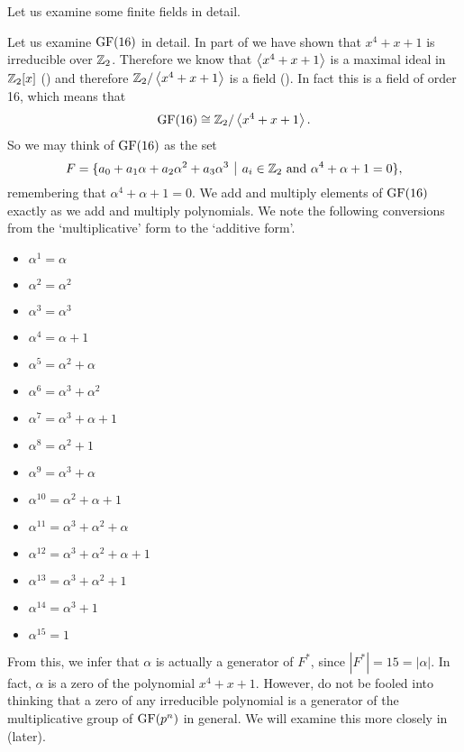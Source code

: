 Let us examine some finite fields in detail.
\begin{example}\label{example-GF16-analysis}
    Let us examine $\mathrm{GF}(16)$ in detail. In part of  we have shown that $x^4 + x + 1$ is irreducible over $\mathbb{Z}_2$. Therefore we know that $\left\langle x^4 + x + 1\right\rangle$ is a maximal ideal in $\mathbb{Z}_2[x]$ () and therefore $\mathbb{Z}_2/\left\langle x^4+x+1\right\rangle$ is a field (). In fact this is a field of order 16, which means that
    \[
        \mathrm{GF}(16) \cong \mathbb{Z}_2/\left\langle x^4+x+1\right\rangle.
    \]
    So we may think of $\mathrm{GF}(16)$ as the set
    \[
        F = \{a_0 + a_1\alpha + a_2\alpha^2 + a_3\alpha^3 \vert a_i \in \Z_2 \text{ and } \alpha^4 + \alpha + 1 = 0\},
    \]
    remembering that $\alpha^4 + \alpha + 1 = 0$. We add and multiply elements of $\mathrm{GF}(16)$ exactly as we add and multiply polynomials. We note the following conversions from the `multiplicative' form to the `additive form'.
    \begin{multicols}{2}
        \begin{itemize}
            \item $\alpha^1 = \alpha$
            \item $\alpha^2 = \alpha^2$
            \item $\alpha^3 = \alpha^3$
            \item $\alpha^4 = \alpha + 1$
            \item $\alpha^5 = \alpha^2 + \alpha$
            \item $\alpha^6 = \alpha^3 + \alpha^2$
            \item $\alpha^7 = \alpha^3 + \alpha + 1$
            \item $\alpha^8 = \alpha^2 + 1$
            \item $\alpha^9 = \alpha^3 + \alpha$
            \item $\alpha^{10} = \alpha^2 + \alpha + 1$
            \item $\alpha^{11} = \alpha^3 + \alpha^2 + \alpha$
            \item $\alpha^{12} = \alpha^3 + \alpha^2 + \alpha + 1$
            \item $\alpha^{13} = \alpha^3 + \alpha^2 + 1$
            \item $\alpha^{14} = \alpha^3 + 1$
            \item $\alpha^{15} = 1$
        \end{itemize}
    \end{multicols}
    From this, we infer that $\alpha$ is actually a generator of $F^\ast$, since $|F^\ast| = 15 = |\alpha|$. In fact, $\alpha$ is a zero of the polynomial $x^4 + x + 1$. However, do not be fooled into thinking that a zero of any irreducible polynomial is a generator of the multiplicative group of $\mathrm{GF}(p^n)$ in general. We will examine this more closely in  (later).


\end{example}

